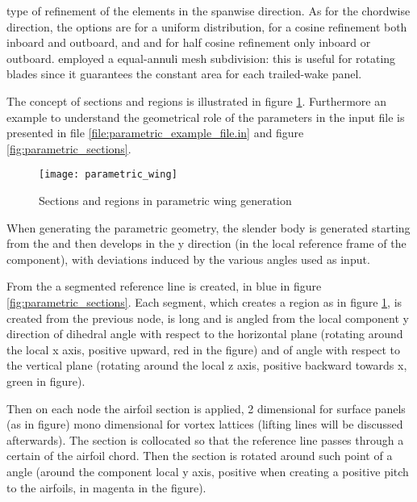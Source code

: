 \begin{itemize}
type of refinement of the elements in the spanwise direction. As for the chordwise direction, 
the options are  for a uniform distribution,  for a cosine refinement both 
inboard and outboard, and  and  for half cosine refinement only inboard or outboard. 
 employed a equal-annuli mesh subdivision: this is useful for rotating blades since it guarantees the constant 
area for each trailed-wake panel. 
  
\end{itemize}


The concept of sections and regions is illustrated in figure \ref{fig:parametric_wing}. 
Furthermore an example to understand the geometrical role of the parameters in the input file is presented 
in file \ref{file:parametric_example_file.in} and figure \ref{fig:parametric_sections}.

\begin{figure}[h]
\centering
\texttt{[image: parametric\_wing]}
\caption{Sections and regions in parametric wing generation}
\label{fig:parametric_wing}
\end{figure}

When generating the parametric geometry, the slender body is generated starting from the  
and then develops in the y direction (in the local reference frame of the component), 
with deviations induced by the various angles used as input. 

From the  a segmented reference line is created, in blue in figure \ref{fig:parametric_sections}. 
Each segment, which creates a region as in figure \ref{fig:parametric_wing}, is created from the previous node, 
is long  and is angled from the local component y direction of  dihedral angle with respect 
to the horizontal plane (rotating around the local x axis, positive upward, red in the figure) and of  
angle with respect to the vertical plane (rotating around the local z axis, positive backward towards x, green in figure). 

Then on each node the airfoil section is applied, 2 dimensional for surface panels (as in figure) mono dimensional for 
vortex lattices (lifting lines will be discussed afterwards). 
The section is collocated so that the reference line passes through a certain  
of the airfoil chord. Then the section is rotated around such point of a  angle 
(around the component local y axis, positive when creating a positive pitch to the airfoils, in magenta in the figure). 


